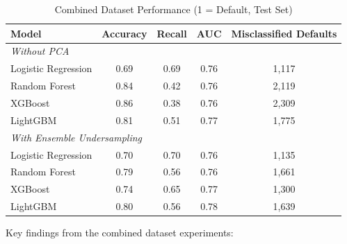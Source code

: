\begin{table}[H]
\centering
\caption{Combined Dataset Performance (1 = Default, Test Set)}
\label{tab:combined_results}
\begin{tabular}{lcccc}
\toprule
\textbf{Model} & \textbf{Accuracy} & \textbf{Recall} & \textbf{AUC} & \textbf{Misclassified Defaults} \\
\midrule
\multicolumn{5}{l}{\textit{Without PCA}} \\
Logistic Regression & 0.69 & 0.69 & 0.76 & 1,117 \\
Random Forest & 0.84 & 0.42 & 0.76 & 2,119 \\
XGBoost & 0.86 & 0.38 & 0.76 & 2,309 \\
LightGBM & 0.81 & 0.51 & 0.77 & 1,775 \\
\midrule
\multicolumn{5}{l}{\textit{With Ensemble Undersampling}} \\
Logistic Regression & 0.70 & 0.70 & 0.76 & 1,135 \\
Random Forest & 0.79 & 0.56 & 0.76 & 1,661 \\
XGBoost & 0.74 & 0.65 & 0.77 & 1,300 \\
LightGBM & 0.80 & 0.56 & 0.78 & 1,639 \\
\bottomrule
\end{tabular}
\end{table}



Key findings from the combined dataset experiments:

